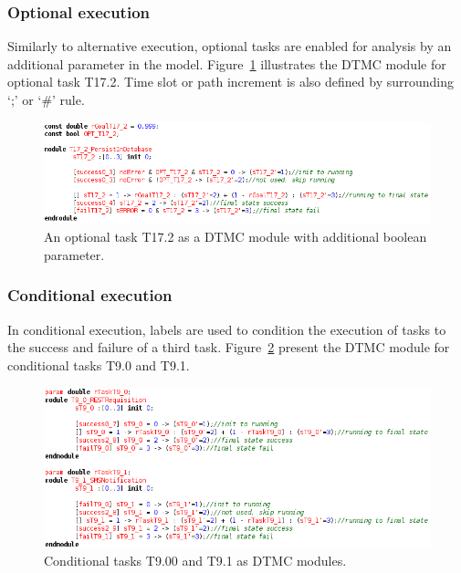 \subsubsection{Optional execution}

Similarly to alternative execution, optional tasks are enabled for analysis by an additional parameter in the model. Figure~\ref{fig:PRISM_OPT_TSK} illustrates the DTMC module for optional task T17.2. Time slot or path increment is also defined by surrounding `;' or `\#' rule. 

\begin{figure}[ht!]
\centering
\includegraphics[width=1\textwidth]{imgs/PRISM_OPT_TSK.png}
\caption{An optional task T17.2 as a DTMC module with additional boolean parameter.}
\label{fig:PRISM_OPT_TSK}
\end{figure}

\subsubsection{Conditional execution}

In conditional execution, labels are used to condition the execution of tasks to the success and failure of a third task. Figure~\ref{fig:PRISM_TRY_TSKS} present the DTMC module for conditional tasks T9.0 and T9.1. 

\begin{figure}[ht!]
\centering
\includegraphics[width=1\textwidth]{imgs/PRISM_TRY_TSKS.png}
\caption{Conditional tasks T9.00 and T9.1 as DTMC modules.}
\label{fig:PRISM_TRY_TSKS}
\end{figure}


